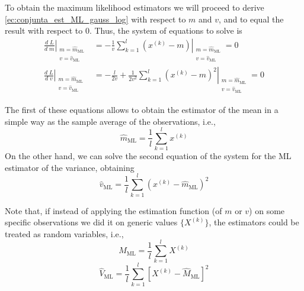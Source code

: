 \begin{example}
To obtain the maximum likelihood estimators we will proceed to derive \eqref{ec:conjunta_est_ML_gauss_log} with respect to $m$ and $v$, and to equal the result with respect to 0. Thus, the system of equations to solve is
\begin{equation}
\begin{split}
\left.\frac{d\;L}{d\;m} \right|_{\begin{array}{l} m = \hat m_{\text{ML}} \\ v = \hat v_{\text{ML}} \end{array}} & = \left. -\frac{1}{v} \sum_{k=1}^{l} (x^{(k)} - m)\right|_{\begin{array}{l} m = \hat m_{\text{ML}} \\ v = \hat v_{\text{ML}} \end{array}}= 0\\
\left.\frac{d\;L}{d\;v} \right|_{\begin{array}{l} m = \hat m_{\text{ML}} \\ v = \hat v_{\text{ML}} \end{array}} & = \left. -\frac{l}{2v} + \frac{1}{2 v^2} \sum_{k=1}^l (x^{(k)}-m)^2 \right|_{\begin{array}{l} m = \hat m_{\text{ML}} \\ v = \hat v_{\text{ML}} \end{array}}= 0
\end{split}
\end{equation}

The first of these equations allows to obtain the estimator of the mean in a simple way as the sample average of the observations, i.e., 
\begin{equation}
\hat m_{\text{ML}} = \frac{1}{l} \sum_{k=1}^l x^{(k)}
\end{equation}
On the other hand, we can solve the second equation of the system for the ML estimator of the variance, obtaining
\begin{equation}
\hat v_{\text{ML}} = \frac{1}{l} \sum_{k=1}^l (x^{(k)}-\hat m_{\text{ML}})^2
\end{equation}

Note that, if instead of applying the estimation function (of $m$ or $v$) on some specific observations we did it on generic values $\{X^{(k)}\}$, the estimators could be treated as random variables, i.e.,
\begin{equation}
\hat M_{\text{ML}} = \frac{1}{l} \sum_{k=1}^l X^{(k)}
\end{equation}
\begin{equation}
\hat V_{\text{ML}} = \frac{1}{l} \sum_{k=1}^l [X^{(k)}-\hat M_{\text{ML}}]^2
\end{equation}


\end{example}\vspace{0.4cm}

